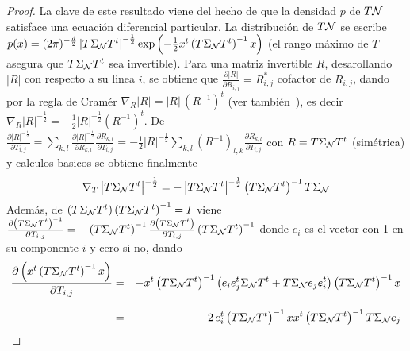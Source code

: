 \begin{proof}
  La  clave de  este resultado  viene del  hecho de  que la  densidad $p$  de $T
  \mathcal{N}$ satisface una ecuaci\'on diferencial particular.
  La  distribuci\'on de  $T \mathcal{N}$  se escribe  $p(x) =  (2 \pi)^{-\frac{d}{2}}
  \left| T \Sigma_{\mathcal{N}} T^t  \right|^{-\frac12} \exp\left( - \frac12 x^t \left(
      T  \Sigma_{\mathcal{N}} T^t  \right)^{-1} x  \right)$ (el  rango m\'aximo  de $T$
  asegura que $T \Sigma_{\mathcal{N}} T^t$ sea invertible).  Para una matriz invertible
  $R$,  desarollando  $|R|$  con  respecto  a  su  linea  $i$,  se  obtiene  que
  $\frac{\partial  |R|}{\partial R_{i,j}}  = R_{i,j}^*$  cofactor  de $R_{i,j}$,
  dando por la regla de Cram\'er $\nabla_R |R| = |R| \, \left( R^{-1} \right)^t$
  (ver     tambi\'en~\cite[cap.~1~\&~9]{MagNeu99}),    es     decir    $\nabla_R
  |R|^{-\frac12}  =  -\frac12   |R|^{-\frac12}  \left(  R^{-1}  \right)^t$.   De
  $\frac{\partial |R|^{-\frac12}}{\partial  T_{i,j}} = \sum_{k,l} \frac{\partial
    |R|^{-\frac12}}{\partial R_{k,l}}  \frac{\partial R_{k,l}}{\partial T_{i,j}}
  =   -\frac12    |R|^{-\frac12}   \sum_{k,l}   \left(    R^{-1}   \right)_{l,k}
  \frac{\partial  R_{k,l}}{\partial  T_{i,j}}$ con  $R  =  T \Sigma_{\mathcal{N}}  T^t$
  (sim\'etrica)  y calculos  basicos  se obtiene  finalmente
  \[
  \nabla_T  \left|   T  \Sigma_{\mathcal{N}}  T^t  \right|^{-\frac12}  =   -  \left|  T
    \Sigma_{\mathcal{N}} T^t \right|^{-\frac12} \left( T \Sigma_{\mathcal{N}} T^t \right)^{-1}
  T \Sigma_{\mathcal{N}}
  \]
  Adem\'as,  de $\left(  T \Sigma_{\mathcal{N}}  T^t \right)  \left( T  \Sigma_{\mathcal{N}} T^t
  \right)^{-1}   =  I$   viene  $\frac{\partial   \left(  T   \Sigma_{\mathcal{N}}  T^t
    \right)^{-1}}{\partial T_{i,j}} = -  \left( T \Sigma_{\mathcal{N}} T^t \right)^{-1}
  \frac{\partial \left( T \Sigma_{\mathcal{N}}  T^t \right)}{\partial T_{i,j}} \left( T
    \Sigma_{\mathcal{N}}  T^t  \right)^{-1}$ donde  $e_i$  es el  vector  con  1 en  su
  componente $i$ y cero si no, dando
  \begin{eqnarray*}
  \frac{\partial \left( x^t \left( T \Sigma_{\mathcal{N}} T^t \right)^{-1} x
  \right)}{\partial T_{i,j}} & = & - x^t \left( T \Sigma_{\mathcal{N}} T^t \right)^{-1}
  \left( e_i e_j^t \Sigma_{\mathcal{N}} T^t + T \Sigma_{\mathcal{N}} e_j e_i^t \right) \left( T
  \Sigma_{\mathcal{N}} T^t \right)^{-1} x\\[2.5mm]
  & = & - 2 \, e_i^t \left( T \Sigma_{\mathcal{N}} T^t \right)^{-1} x x^t \left( T
  \Sigma_{\mathcal{N}} T^t \right)^{-1} T \Sigma_{\mathcal{N}} e_j
  \end{eqnarray*}

\end{proof}
